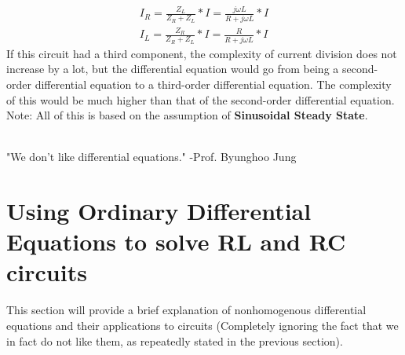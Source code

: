 \documentclass[nobib]{tufte-handout}
\begin{document}
\begin{align*}
    I_R=\frac{Z_L}{Z_R+Z_L}*I=\frac{j \omega L}{R+j \omega L}*I\\
    I_L=\frac{Z_R}{Z_R+Z_L}*I=\frac{R}{R+j \omega L}*I
\end{align*}
If this circuit had a third component, the complexity of current division does not increase by a lot, but the differential equation would go from being a second-order differential equation to a third-order differential equation. The complexity of this would be much higher than that of the second-order differential equation.
\\Note: All of this is based on the assumption of \textbf{Sinusoidal Steady State}.
\\~\\
\begin{center}
    "We don't like differential equations." -Prof. Byunghoo Jung
\end{center}
\pagebreak
\section{Using Ordinary Differential Equations to solve RL and RC circuits}
This section will provide a brief explanation of nonhomogenous differential equations and their applications to circuits (Completely ignoring the fact that we in fact do not like them, as repeatedly stated in the previous section).
\end{document}
